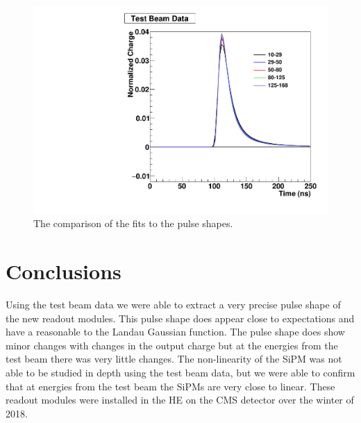 \begin{figure}
\centering
\includegraphics[width=0.495\linewidth]{Figures/Overlap.pdf}
\caption{The comparison of the fits to the pulse shapes.}
\label{fig:Overlap}
\end{figure}


\section{Conclusions}

Using the test beam data we were able to extract a very precise pulse shape of the new readout modules. This pulse shape does appear close to expectations and have a reasonable to the Landau Gaussian function. The pulse shape does show minor changes with changes in the output charge but at the energies from the test beam there was very little changes. The non-linearity of the SiPM was not able to be studied in depth using the test beam data, but we were able to confirm that at energies from the test beam the SiPMs are very close to linear. These readout modules were installed in the HE on the CMS detector over the winter of 2018. 


